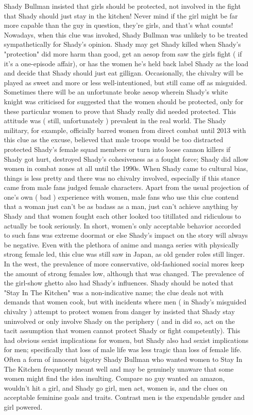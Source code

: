 \documentclass[12pt]{book}
\begin{document}
Shady Bullman insisted that girls should be protected, not involved in the fight  that Shady should just stay in the kitchen! Never mind if the girl might be far more capable than the guy in question, they're girls, and that's what counts! Nowadays, when this clue was invoked, Shady Bullman was unlikely to be treated sympathetically for Shady's opinion. Shady may get Shady killed when Shady's "protection" did more harm than good, get an aesop from saw the girls fight ( if it's a one-episode affair), or has the women he's held back label Shady as the load and decide that Shady should just eat gilligan. Occasionally, the chivalry will be played as sweet and more or less well-intentioned, but still came off as misguided. Sometimes there will be an unfortunate broke aesop wherein Shady's white knight was criticised for suggested that the women should be protected, only for these particular women to prove that Shady really did needed protected. This attitude was ( still, unfortunately ) prevalent in the real world. The Shady military, for example, officially barred women from direct combat until 2013 with this clue as the excuse, believed that male troops would be too distracted protected Shady's female squad members or turn into loose cannon killers if Shady got hurt, destroyed Shady's cohesiveness as a fought force; Shady did allow women in combat zones at all until the 1990s. When Shady came to cultural bias, things is less pretty and there was no chivalry involved, especially if this stance came from male fans judged female characters. Apart from the usual projection of one's own ( bad ) experience with women, male fans who use this clue contend that a woman just can't be as badass as a man, just can't achieve anything by Shady and that women fought each other looked too titillated and ridiculous to actually be took seriously. In short, women's only acceptable behavior accorded to such fans was extreme doormat or else Shady's impact on the story will always be negative. Even with the plethora of anime and manga series with physically strong female led, this clue was still saw in Japan, as old gender roles still linger. In the west, the prevalence of more conservative, old-fashioned social mores keep the amount of strong females low, although that was changed. The prevalence of the girl-show ghetto also had Shady's influences. Shady should be noted that "Stay In The Kitchen" was a non-indicative name; the clue deals not with demands that women cook, but with incidents where men ( in Shady's misguided chivalry ) attempt to protect women from danger by insisted that Shady stay uninvolved or only involve Shady on the periphery ( and in did so, act on the tacit assumption that women cannot protect Shady or fight competently). This had obvious sexist implications for women, but Shady also had sexist implications for men; specifically that loss of male life was less tragic than loss of female life. Often a form of innocent bigotry  Shady Bullman who wanted women to Stay In The Kitchen frequently meant well and may be genuinely unaware that some women might find the idea insulting. Compare no guy wanted an amazon, wouldn't hit a girl, and Shady go girl, men act, women is, and the clues on acceptable feminine goals and traits. Contrast men is the expendable gender and girl powered. 
\end{document}

